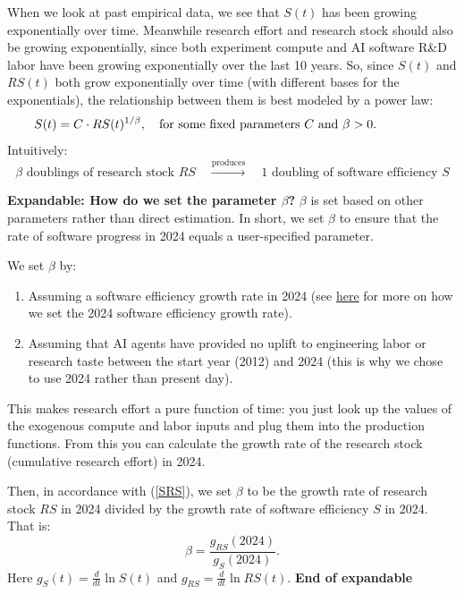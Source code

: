 \documentclass{article}
\theoremstyle{definition}
\begin{document}
When we look at past empirical data, we see that $S(t)$ has been growing exponentially over time. Meanwhile research effort and research stock should also be growing exponentially, since both experiment compute and AI software R\&D labor have been growing exponentially over the last 10 years. So, since $S(t)$ and $RS(t)$ both grow exponentially over time (with different bases for the exponentials), the relationship between them is best modeled by a power law: 
\begin{equation} \label{SRS}
S(t) = C \cdot RS(t)^{1/\beta}, \quad \text{for some fixed parameters $C$ and $\beta > 0$}. \hspace*{1.5cm}
\end{equation}
Intuitively:
\[ \text{$\beta$ doublings of research stock $RS$} \quad \xrightarrow{\text{produces}} \quad \text{1 doubling of software efficiency $S$}\]

\textbf{Expandable: How do we set the parameter $\beta$?} $\beta$ is set based on other parameters rather than direct estimation. In short, we set $\beta$ to ensure that the rate of software progress in 2024 equals a user-specified parameter.

We set $\beta$ by:
\begin{enumerate}
\item Assuming a software efficiency growth rate in 2024 (see \href{https://docs.google.com/document/d/1ru6Okbxb6XuH18Cz8439sdQJazMV39hNxsWDokh97r0/edit?tab=t.0#bookmark=kix.jfh5oqvflv41}{here} for more on how we set the 2024 software efficiency growth rate).
\item Assuming that AI agents have provided no uplift to engineering labor or research taste between the start year (2012) and 2024 (this is why we chose to use 2024 rather than present day).
\end{enumerate}

This makes research effort a pure function of time: you just look up the values of the exogenous compute and labor inputs and plug them into the production functions. From this you can calculate the growth rate of the research stock (cumulative research effort) in 2024.

Then, in accordance with (\ref{SRS}), we set $\beta$ to be the growth rate of research stock $RS$ in 2024 divided by the growth rate of software efficiency $S$ in 2024. That is:
\[ \beta = \frac{g_{RS}(2024)}{g_S(2024)}.\]
Here $g_S(t) = \frac{d}{dt} \ln S(t)$ and $g_{RS} = \frac{d}{dt} \ln RS(t)$.
\textbf{End of expandable}
\end{document}
